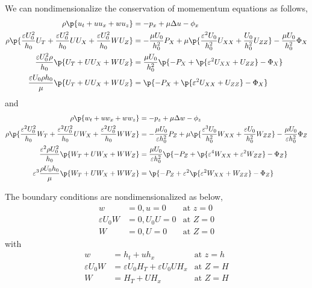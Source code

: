   We can nondimensionalize the conservation of momementum equations as follows,
  \begin{align*}
    \rho\p{u_t + u u_x + w u_z} &= -p_x + \mu \Delta u - \phi_x \\
    \rho\p{\frac{\varepsilon U_0^2}{h_0} U_T + \frac{\varepsilon U_0^2}{h_0} UU_X
    + \frac{\varepsilon U_0^2}{h_0} WU_Z} &= -\frac{\mu U_0}{h_0^2} P_X
    + \mu \p{\frac{\varepsilon^2 U_0}{h_0^2} U_{XX} + \frac{U_0}{h_0^2} U_{ZZ}}
    - \frac{\mu U_0}{h_0^2} \Phi_X \\
    \frac{\varepsilon U_0^2 \rho}{h_0}\p{U_T + UU_X + WU_Z} &=
    \frac{\mu U_0}{h_0^2}\p{-P_X + \p{\varepsilon^2 U_{XX} + U_{ZZ}} - \Phi_X } \\
    \frac{\varepsilon U_0 \rho h_0}{\mu}\p{U_T + UU_X + WU_Z} &=
    \p{-P_X + \p{\varepsilon^2 U_{XX} + U_{ZZ}} - \Phi_X }
  \end{align*}
  and
  \begin{align*}
    \rho\p{w_t + u w_x + w w_z} &= -p_z + \mu \Delta w - \phi_z \\
    \rho\p{\frac{\varepsilon^2 U_0^2}{h_0} W_T + \frac{\varepsilon^2 U_0^2}{h_0} UW_X
    + \frac{\varepsilon^2 U_0^2}{h_0} WW_Z} &= -\frac{\mu U_0}{\varepsilon h_0^2} P_Z
    + \mu \p{\frac{\varepsilon^3 U_0}{h_0^2} W_{XX}
    + \frac{\varepsilon U_0}{h_0^2} W_{ZZ}}
    - \frac{\mu U_0}{\varepsilon h_0^2} \Phi_Z \\
    \frac{\varepsilon^2 \rho U_0^2}{h_0}\p{W_T + UW_X + WW_Z} &=
    \frac{\mu U_0}{\varepsilon h_0^2} \p{-P_Z
    + \p{\varepsilon^4 W_{XX} + \varepsilon^2 W_{ZZ}} - \Phi_Z} \\
    \varepsilon^3 \frac{\rho U_0 h_0}{\mu}\p{W_T + UW_X + WW_Z} &=
    \p{-P_Z + \varepsilon^2\p{\varepsilon^2 W_{XX} + W_{ZZ}} - \Phi_Z}
  \end{align*}

  The boundary conditions are nondimensionalized as below,
  \begin{align*}
    w &= 0, u = 0 &\text{at } z = 0 \\
    \varepsilon U_0 W &= 0, U_0 U = 0 &\text{at } Z = 0 \\
    W &= 0, U = 0 &\text{at } Z = 0
  \end{align*}
  with
  \begin{align*}
    w &= h_t + u h_x &\text{at } z = h \\
    \varepsilon U_0 W &= \varepsilon U_0 H_T + \varepsilon U_0 U H_x &\text{at } Z = H \\
    W &= H_T + U H_x &\text{at } Z = H
  \end{align*}

